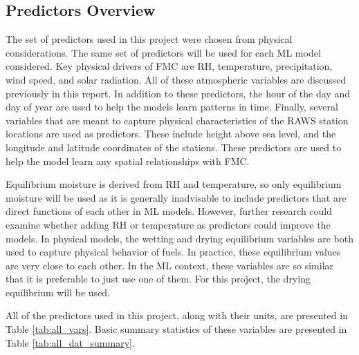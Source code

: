 \documentclass[11pt]{article}%
\begin{document}
\subsection{Predictors Overview}

The set of predictors used in this project were chosen from physical considerations. The same set of predictors will be used for each ML model considered. Key physical drivers of FMC are RH, temperature, precipitation, wind speed, and solar radiation. All of these atmospheric variables are discussed previously in this report. In addition to these predictors, the hour of the day and day of year are used to help the models learn patterns in time. Finally, several variables that are meant to capture physical characteristics of the RAWS station locations are used as predictors. These include height above sea level, and the longitude and latitude coordinates of the stations. These predictors are used to help the model learn any spatial relationships with FMC.

Equilibrium moisture is derived from RH and temperature, so only equilibrium moisture will be used as it is generally inadvisable to include predictors that are direct functions of each other in ML models. However, further research could examine whether adding RH or temperature as predictors could improve the models. In physical models, the wetting and drying equilibrium variables are both used to capture physical behavior of fuels. In practice, these equilibrium values are very close to each other. In the ML context, these variables are so similar that it is preferable to just use one of them. For this project, the drying equilibrium will be used. 

All of the predictors used in this project, along with their units, are presented in Table \ref{tab:all_vars}. Basic summary statistics of these variables are presented in Table \ref{tab:all_dat_summary}.
\end{document}
